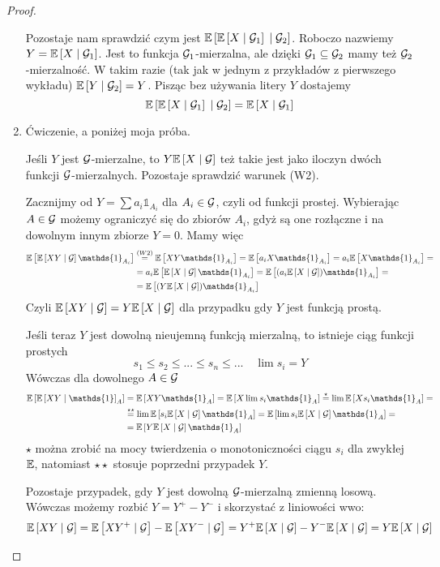 \begin{proof}
\begin{enumerate}
        Pozostaje nam sprawdzić czym jest $\expected{\expected{X}{\set{G}_1}}{\set{G}_2}$. Roboczo nazwiemy $Y=\expected{X}{\set{G}_1}$. Jest to funkcja $\mathcal{G}_1$-mierzalna, ale dzięki $\mathcal{G}_1\subseteq\mathcal{G}_2$ mamy też $\mathcal{G}_2$-mierzalność. W takim razie (tak jak w jednym z przykładów z pierwszego wykładu) $\expected{Y}{\set{G}_2}=Y$. Pisząc bez używania litery $Y$ dostajemy
        $$\expected{\expected{X}{\set{G}_1}}{\set{G}_2}=\expected{X}{\set{G}_1}$$
    \item Ćwiczenie, a poniżej moja próba.

      Jeśli $Y$ jest $\mathcal{G}$-mierzalne, to $Y\expected{X}{\set{G}}$ też takie jest jako iloczyn dwóch funkcji $\mathcal{G}$-mierzalnych. Pozostaje sprawdzić warunek (W2).

      Zacznijmy od $Y=\sum a_i\mathds{1}_{A_i}$ dla $A_i\in\mathcal{G}$, czyli od funkcji prostej. Wybierając $A\in\mathcal{G}$ możemy ograniczyć się do zbiorów $A_i$, gdyż są one rozłączne i na dowolnym innym zbiorze $Y=0$. Mamy więc
      \begin{align*}
        \expected{\expected{XY}{\set{G}}\mathds{1}_{A_i}}&\overset{(W2)}{=}\expected{XY\mathds{1}_{A_i}}=\expected{a_iX\mathds{1}_{A_i}}=a_i\expected{X\mathds{1}_{A_i}}=\\
                                                          &=a_i\expected{\expected{X}{\set{G}}\mathds{1}_{A_i}}=\expected{(a_i\expected{X}{\set{G}})\mathds{1}_{A_i}}=\\
                                                          &=\expected{(Y\expected{X}{\set{G}})\mathds{1}_{A_i}}
      \end{align*}
      Czyli $\expected{XY}{\set{G}}=Y\expected{X}{\set{G}}$ dla przypadku gdy $Y$ jest funkcją prostą.

      Jeśli teraz $Y$ jest dowolną nieujemną funkcją mierzalną, to istnieje ciąg funkcji prostych
      $$s_1\leq s_2\leq...\leq s_n\leq...\quad \lim s_i=Y$$
      Wówczas dla dowolnego $A\in\mathcal{G}$
      \begin{align*}
        \expected{\expected{XY}\mathds{1}_A}&=\expected{XY\mathds{1}_A}=\expected{X\lim s_i\mathds{1}_A}\overset{\star}{=}\lim\expected{X s_i\mathds{1}_A}=\\
                                            &\overset{\star\star}{=}\lim \expected{s_i\expected{X}{\set{G}}\mathds{1}_A}=\expected{\lim s_i\expected{X}{\set{G}}\mathds{1}_A}=\\
                                            &=\expected{Y\expected{X}{\set{G}}\mathds{1}_A}
      \end{align*}
      $\star$ można zrobić na mocy twierdzenia o monotoniczności ciągu $s_i$ dla zwykłej $\expected$, natomiast $\star\star$ stosuje poprzedni przypadek $Y$.

      Pozostaje przypadek, gdy $Y$ jest dowolną $\mathcal{G}$-mierzalną zmienną losową. Wówczas możemy rozbić $Y=Y^+-Y^-$ i skorzystać z liniowości wwo:
      $$\expected{XY}{\set{G}}=\expected{XY^+}{\set{G}}-\expected{XY^-}{\set{G}}=Y^+\expected{X}{\set{G}}-Y^-\expected{X}{\set{G}}=Y\expected{X}{\set{G}}$$
  \end{enumerate}
\end{proof}

